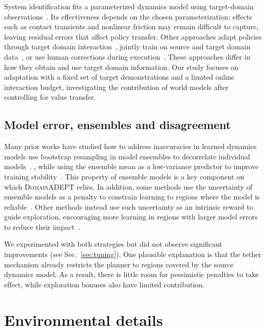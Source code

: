 \documentclass{article} %
\newcommand{\DomainADEPT}{\textsc{DomainADEPT}\xspace}
\begin{document}
System identification fits a parameterized dynamics model using target-domain observations~\citep{ramos2019bayessim, chebotar2019closing, memmel2024asid, xu2026deal}. Its effectiveness depends on the chosen parameterization: effects such as contact transients and nonlinear friction may remain difficult to capture, leaving residual errors that affect policy transfer. Other approaches adapt policies through target domain interaction~\citep{torne2024reconciling}, jointly train on source and target domain data~\citep{maddukuri2025sim, shi2026beyond}, or use human corrections during execution~\citep{pmlr-v270-jiang25a}. These approaches differ in how they obtain and use target domain information. Our study focuses on adaptation with a fixed set of target demonstrations and a limited online interaction budget, investigating the contribution of world models after controlling for value transfer.

\subsection{Model error, ensembles and disagreement}
\label{app:rw-ensemble}

Many prior works have studied how to address inaccuracies in learned dynamics models use bootstrap resampling in model ensembles to decorrelate individual models~\citep{abbeel2006using}. \citet{lakshminarayanan2017simple}, while using the ensemble mean as a low-variance predictor to improve training stability~\citep{kurutach2018model}. This property of ensemble models is a key component on which \DomainADEPT relies. In addition, some methods use the uncertainty of ensemble models as a penalty to constrain learning to regions where the model is reliable~\citep{kidambi2020morel, yu2020mopo, yu2021combo}. Other methods instead use such uncertainty as an intrinsic reward to guide exploration, encouraging more learning in regions with larger model errors to reduce their impact~\citep{pathak2019self, shyam2019model, sekar2020planning}.

We experimented with both strategies but did not observe significant improvements (see Sec.~\ref{sec:tuning}). One plausible explanation is that the tether mechanism already restricts the planner to regions covered by the source dynamics model. As a result, there is little room for pessimistic penalties to take effect, while exploration bonuses also have limited contribution.


\section{Environmental details}
\end{document}
